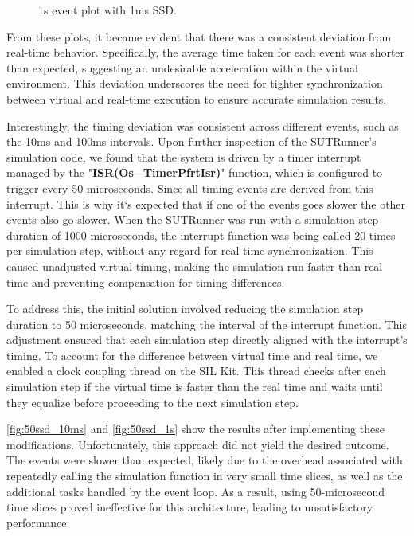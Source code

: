\begin{figure}[h]
\begin{minipage}{0.5\textwidth}
    \caption{1s event plot with 1ms SSD.} 
    \label{fig:1000ssd_1s}
  \end{minipage}
\end{figure}
From these plots, it became evident that there was a consistent deviation from real-time behavior. Specifically, the average time taken for each event was shorter than expected, suggesting an undesirable acceleration within the virtual environment. This deviation underscores the need for tighter synchronization between virtual and real-time execution to ensure accurate simulation results.

Interestingly, the timing deviation was consistent across different events, such as the 10ms and 100ms intervals. Upon further inspection of the SUTRunner's simulation code, we found that the system is driven by a timer interrupt managed by the "\textbf{ISR(Os\_TimerPfrtIsr)}" function, which is configured to trigger every 50 microseconds. Since all timing events are derived from this interrupt. This is why it`s expected that if one of the events goes slower the other events also go slower. When the SUTRunner was run with a simulation step duration of 1000 microseconds, the interrupt function was being called 20 times per simulation step, without any regard for real-time synchronization. This caused unadjusted virtual timing, making the simulation run faster than real time and preventing compensation for timing differences.


To address this, the initial solution involved reducing the simulation step duration to 50 microseconds, matching the interval of the interrupt function. This adjustment ensured that each simulation step directly aligned with the interrupt's timing. To account for the difference between virtual time and real time, we enabled a clock coupling thread on the SIL Kit. This thread checks after each simulation step if the virtual time is faster than the real time and waits until they equalize before proceeding to the next simulation step.

 \autoref{fig:50ssd_10ms} and \autoref{fig:50ssd_1s} show the results after implementing these modifications. Unfortunately, this approach did not yield the desired outcome. The events were slower than expected, likely due to the overhead associated with repeatedly calling the simulation function in very small time slices, as well as the additional tasks handled by the event loop. As a result, using 50-microsecond time slices proved ineffective for this architecture, leading to unsatisfactory performance.

